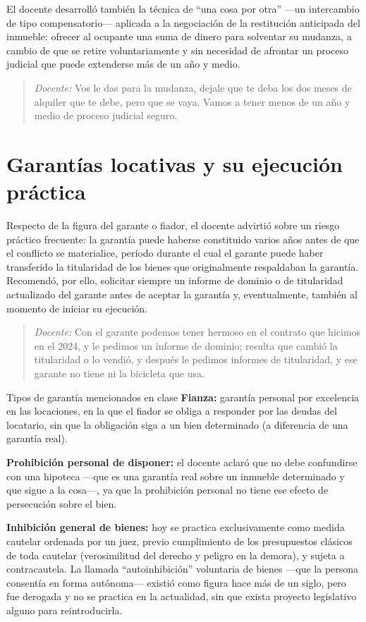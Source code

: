 \documentclass[12pt,oneside]{book}
\begin{document}
El docente desarrolló también la técnica de ``una cosa por otra'' —un intercambio de tipo compensatorio— aplicada a la negociación de la restitución anticipada del inmueble: ofrecer al ocupante una suma de dinero para solventar su mudanza, a cambio de que se retire voluntariamente y sin necesidad de afrontar un proceso judicial que puede extenderse más de un año y medio.

\begin{quote}
\textit{Docente:} Vos le das para la mudanza, dejale que te deba los dos meses de alquiler que te debe, pero que se vaya. Vamos a tener menos de un año y medio de proceso judicial seguro.
\end{quote}

\section{Garantías locativas y su ejecución práctica}

Respecto de la figura del garante o fiador, el docente advirtió sobre un riesgo práctico frecuente: la garantía puede haberse constituido varios años antes de que el conflicto se materialice, período durante el cual el garante puede haber transferido la titularidad de los bienes que originalmente respaldaban la garantía. Recomendó, por ello, solicitar siempre un informe de dominio o de titularidad actualizado del garante antes de aceptar la garantía y, eventualmente, también al momento de iniciar su ejecución.

\begin{quote}
\textit{Docente:} Con el garante podemos tener hermoso en el contrato que hicimos en el 2024, y le pedimos un informe de dominio; resulta que cambió la titularidad o lo vendió, y después le pedimos informes de titularidad, y ese garante no tiene ni la bicicleta que usa.
\end{quote}

\begin{definition}{Tipos de garantía mencionados en clase}
\textbf{Fianza:} garantía personal por excelencia en las locaciones, en la que el fiador se obliga a responder por las deudas del locatario, sin que la obligación siga a un bien determinado (a diferencia de una garantía real).

\textbf{Prohibición personal de disponer:} el docente aclaró que no debe confundirse con una hipoteca —que es una garantía real sobre un inmueble determinado y que sigue a la cosa—, ya que la prohibición personal no tiene ese efecto de persecución sobre el bien.

\textbf{Inhibición general de bienes:} hoy se practica exclusivamente como medida cautelar ordenada por un juez, previo cumplimiento de los presupuestos clásicos de toda cautelar (verosimilitud del derecho y peligro en la demora), y sujeta a contracautela. La llamada ``autoinhibición'' voluntaria de bienes —que la persona consentía en forma autónoma— existió como figura hace más de un siglo, pero fue derogada y no se practica en la actualidad, sin que exista proyecto legislativo alguno para reintroducirla.
\end{definition}
\end{document}
